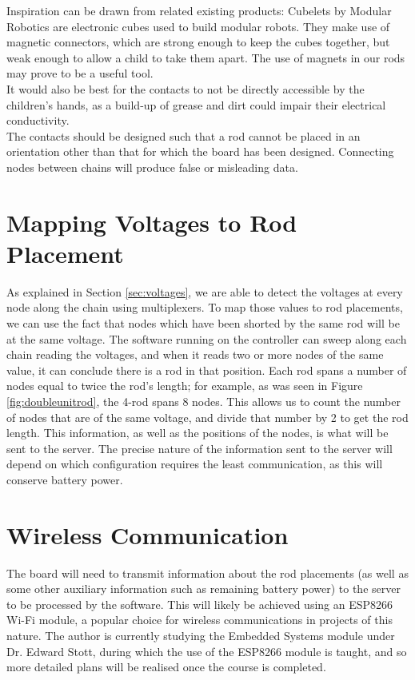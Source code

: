 Inspiration can be drawn from related existing products: Cubelets\textsuperscript{\textregistered} by Modular Robotics \cite{Cubelets52:online} are electronic cubes used to build modular robots. They make use of magnetic connectors, which are strong enough to keep the cubes together, but weak enough to allow a child to take them apart. The use of magnets in our rods may prove to be a useful tool.\\

It would also be best for the contacts to not be directly accessible by the children's hands, as a build-up of grease and dirt could impair their electrical conductivity.\\

The contacts should be designed such that a rod cannot be placed in an orientation other than that for which the board has been designed. Connecting nodes between chains will produce false or misleading data.


\section{Mapping Voltages to Rod Placement}
\label{sec:rodplacement}
As explained in Section \ref{sec:voltages}, we are able to detect the voltages at every node along the chain using multiplexers. To map those values to rod placements, we can use the fact that nodes which have been shorted by the same rod will be at the same voltage. The software running on the controller can sweep along each chain reading the voltages, and when it reads two or more nodes of the same value, it can conclude there is a rod in that position. Each rod spans a number of nodes equal to twice the rod's length; for example, as was seen in Figure \ref{fig:doubleunitrod}, the 4-rod spans 8 nodes. This allows us to count the number of nodes that are of the same voltage, and divide that number by 2 to get the rod length. This information, as well as the positions of the nodes, is what will be sent to the server. The precise nature of the information sent to the server will depend on which configuration requires the least communication, as this will conserve battery power.


\section{Wireless Communication}
The board will need to transmit information about the rod placements (as well as some other auxiliary information such as remaining battery power) to the server to be processed by the software. This will likely be achieved using an ESP8266 Wi-Fi module, a popular choice for wireless communications in projects of this nature. The author is currently studying the Embedded Systems module under Dr. Edward Stott, during which the use of the ESP8266 module is taught, and so more detailed plans will be realised once the course is completed.

